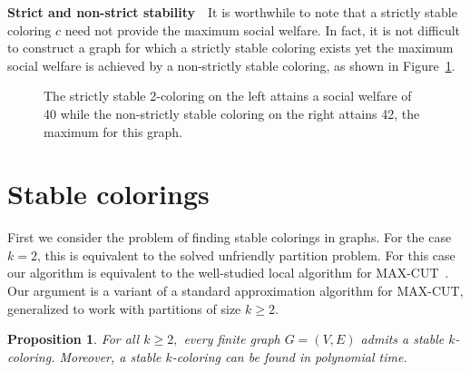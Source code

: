 \documentclass{llncs}
\newtheorem{propn}{Proposition}
\begin{document}
\noindent \textbf{Strict and non-strict stability}\ \
It is worthwhile to note that a strictly stable coloring $c$ need not provide
the maximum social welfare.  In fact, it is not difficult to construct a graph
for which a strictly stable coloring exists yet the maximum social welfare is
achieved by a non-strictly stable coloring, as shown in
Figure~\ref{fig:weakstrongwelfare}. 
\begin{figure}[t]
\centering
{}
\caption{The strictly stable 2-coloring on the left attains a social welfare of
40 while the non-strictly stable coloring on the right attains
42, the maximum for this graph.}
\label{fig:weakstrongwelfare}
\end{figure}

\section{Stable colorings}

First we consider the problem of finding stable colorings in graphs.  For the
case $k=2$, this is equivalent to the solved unfriendly partition problem.  For
this case our algorithm is  equivalent to the well-studied local algorithm for
MAX-CUT~\cite{ElsasserT11,MonienT10}.  Our argument is a variant of a standard
approximation algorithm for MAX-CUT, generalized to work with partitions of size
$k \ge 2$.

\begin{propn}\label{propn:alg}
For all $k \ge 2,$ every finite graph $G=(V,E)$ admits a stable $k$-coloring.
Moreover, a stable $k$-coloring can be found in polynomial time.
\end{propn}
\end{document}
